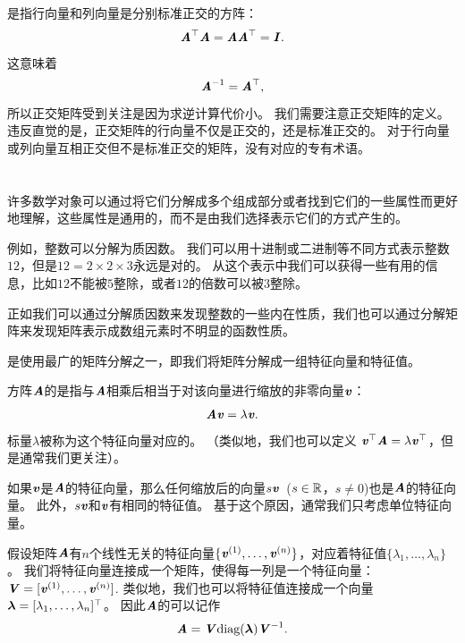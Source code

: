 是指行向量和列向量是分别标准正交的方阵：
\begin{equation}
    \MA^\top\MA=\MA\MA^\top=\MI.
\end{equation}
这意味着 
\begin{equation}
    \MA^{-1}=\MA^\top,
\end{equation}
所以正交矩阵受到关注是因为求逆计算代价小。
我们需要注意正交矩阵的定义。
违反直觉的是，正交矩阵的行向量不仅是正交的，还是标准正交的。
对于行向量或列向量互相正交但不是标准正交的矩阵，没有对应的专有术语。




\section{}
\label{sec:eigendecomposition}

许多数学对象可以通过将它们分解成多个组成部分或者找到它们的一些属性而更好地理解，这些属性是通用的，而不是由我们选择表示它们的方式产生的。


例如，整数可以分解为质因数。
我们可以用十进制或二进制等不同方式表示整数$12$，但是$12=2\times 2\times 3$永远是对的。
从这个表示中我们可以获得一些有用的信息，比如$12$不能被$5$整除，或者$12$的倍数可以被$3$整除。


正如我们可以通过分解质因数来发现整数的一些内在性质，我们也可以通过分解矩阵来发现矩阵表示成数组元素时不明显的函数性质。


是使用最广的矩阵分解之一，即我们将矩阵分解成一组特征向量和特征值。


方阵$\MA$的是指与$\MA$相乘后相当于对该向量进行缩放的非零向量$\Vv$：
\begin{equation}
    \MA\Vv=\lambda \Vv.
\end{equation}
标量$\lambda$被称为这个特征向量对应的。
（类似地，我们也可以定义 $\Vv^\top\MA=\lambda \Vv^\top$，但是通常我们更关注）。


如果$\Vv$是$\MA$的特征向量，那么任何缩放后的向量$s\Vv$~($s\in \SetR$，$s\neq 0$)也是$\MA$的特征向量。
此外，$s\Vv$和$\Vv$有相同的特征值。
基于这个原因，通常我们只考虑单位特征向量。


假设矩阵$\MA$有$n$个线性无关的特征向量$\{\Vv^{(1)}, \dots, \Vv^{(n)}\}$，对应着特征值$\{\lambda_1, \dots , \lambda_n \}$。
我们将特征向量连接成一个矩阵，使得每一列是一个特征向量：$\MV=[\Vv^{(1)}, \dots, \Vv^{(n)}]$.
类似地，我们也可以将特征值连接成一个向量$\Vlambda = [\lambda_1, \dots , \lambda_n]^\top$。
因此$\MA$的可以记作
\begin{equation}
    \MA = \MV \text{diag}(\Vlambda) \MV^{-1}.
\end{equation}


